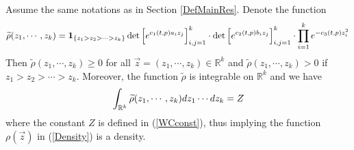 \begin{lemma}{\label{PfDensity}}
	Assume the same notations as in Section \ref{DefMainRes}. Denote the function 
	\begin{align}{\label{rhotilde}}
		\widetilde{\rho}(z_1,\cdots,z_k)=\mathbf{1}_{\{z_1>z_2>\cdots>z_k\}}\det\left[e^{c_{1}(t,p)a_i z_j}\right]_{i,j=1}^{k}\cdot\det\left[e^{c_{2}(t,p)b_i z_j}\right]_{i,j=1}^{k}\cdot\prod_{i=1}^{k}e^{-c_3(t,p)z_{i}^{2}}
	\end{align}
	Then $\widetilde{\rho}(z_1,\cdots,z_k)\geq 0$ for all $\vec{z}=(z_1,\cdots,z_k)\in\mathbb{R}^{k}$ and $\widetilde{\rho}(z_1,\cdots,z_k)>0$ if $z_1>z_2>\cdots>z_k$. Moreover, the function $\widetilde{\rho}$ is integrable on $\mathbb{R}^{k}$ and we have
	\begin{align}{\label{NormCons}}
		\int_{\mathbb{R}^{k}}\widetilde{\rho}(z_1,\cdots,z_k)dz_1\cdots dz_k=Z
	\end{align}
	where the constant $Z$ is defined in (\ref{WCconst}), thus implying the function $\rho(\vec{z})$ in (\ref{Density}) is a density.
\end{lemma}

